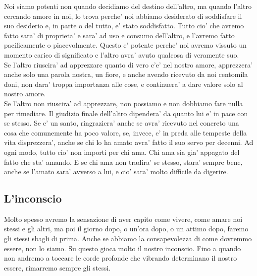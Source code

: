 Noi siamo potenti non quando decidiamo del destino dell'altro, ma quando l'altro cercando amore in noi, lo trova perche' noi abbiamo desiderato di soddisfare il suo desiderio e, in parte o del tutto, e' stato soddisfatto. Tutto cio' che avremo fatto sara' di proprieta' e sara' ad uso e consumo dell'altro, e l'avremo fatto pacificamente o piacevolmente. Questo e' potente perche' noi avremo vissuto un momento carico di significato e l'altro avra' avuto qualcosa di veramente suo.\\

Se l'altro riuscira' ad apprezzare quanto di vero c'e' nel nostro amore, apprezzera' anche solo una parola nostra, un fiore, e anche avendo ricevuto da noi centomila doni, non dara' troppa importanza alle cose, e continuera' a dare valore solo al nostro amore. \\
Se l'altro non riuscira' ad apprezzare, non possiamo e non dobbiamo fare nulla per rimediare. Il giudizio finale dell'altro dipendera' da quanto lui e' in pace con se stesso. Se e' un santo, ringraziera' anche se avra' ricevuto nel concreto una cosa che comunemente ha poco valore, se, invece, e' in preda alle tempeste della vita disprezzera', anche se chi lo ha amato avra' fatto il suo servo per decenni. Ad ogni modo, tutto cio' non importi per chi ama. Chi ama sia gia' appagato del fatto che sta' amando. E se chi ama non tradira' se stesso, stara' sempre bene, anche se l'amato sara' avverso a lui, e cio' sara' molto difficile da digerire. \\

\subsection{L'inconscio}

Molto spesso avremo la sensazione di aver capito come vivere, come amare noi stessi e gli altri, ma poi il giorno dopo, o un'ora dopo, o un attimo dopo, faremo gli stessi sbagli di prima. Anche se abbiamo la consapevolezza di come dovremmo essere, non lo siamo. Su questo gioca molto il nostro inconscio. Fino a quando non andremo a toccare le corde profonde che vibrando determinano il nostro essere, rimarremo sempre gli stessi. 


